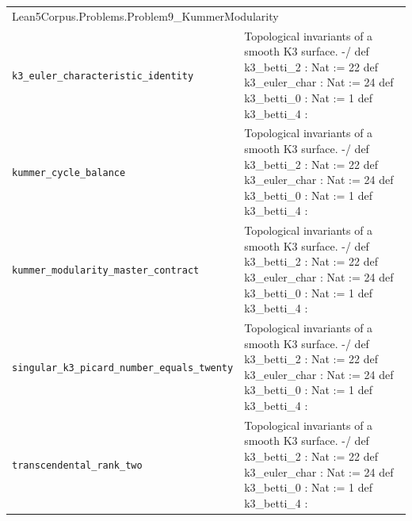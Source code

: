 \begin{longtable}{p{}p{}}
\multicolumn{2}{l}{\textsf{\small Lean5Corpus.Problems.Problem9\_KummerModularity}} \\
\quad\texttt{\footnotesize k3\_euler\_characteristic\_identity} & {\footnotesize Topological invariants of a smooth K3 surface. -/ def k3\_betti\_2 : Nat := 22 def k3\_euler\_char : Nat := 24 def k3\_betti\_0 : Nat := 1 def k3\_betti\_4 : } \\
\quad\texttt{\footnotesize kummer\_cycle\_balance} & {\footnotesize Topological invariants of a smooth K3 surface. -/ def k3\_betti\_2 : Nat := 22 def k3\_euler\_char : Nat := 24 def k3\_betti\_0 : Nat := 1 def k3\_betti\_4 : } \\
\quad\texttt{\footnotesize kummer\_modularity\_master\_contract} & {\footnotesize Topological invariants of a smooth K3 surface. -/ def k3\_betti\_2 : Nat := 22 def k3\_euler\_char : Nat := 24 def k3\_betti\_0 : Nat := 1 def k3\_betti\_4 : } \\
\quad\texttt{\footnotesize singular\_k3\_picard\_number\_equals\_twenty} & {\footnotesize Topological invariants of a smooth K3 surface. -/ def k3\_betti\_2 : Nat := 22 def k3\_euler\_char : Nat := 24 def k3\_betti\_0 : Nat := 1 def k3\_betti\_4 : } \\
\quad\texttt{\footnotesize transcendental\_rank\_two} & {\footnotesize Topological invariants of a smooth K3 surface. -/ def k3\_betti\_2 : Nat := 22 def k3\_euler\_char : Nat := 24 def k3\_betti\_0 : Nat := 1 def k3\_betti\_4 : } \\
\end{longtable}
